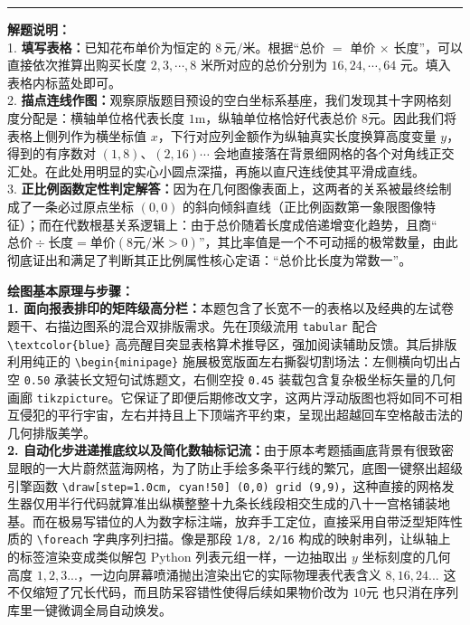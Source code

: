\vspace{0.8cm}
\hrule
\vspace{0.4cm}

{\small\color{gray}
\textbf{解题说明：}\\
1. \textbf{填写表格：}已知花布单价为恒定的 $8\,\text{元/米}$。根据“总价 $=$ 单价 $\times$ 长度”，可以直接依次推算出购买长度 $2, 3, \cdots, 8$ 米所对应的总价分别为 $16, 24, \cdots, 64$ 元。填入表格内标蓝处即可。\\
2. \textbf{描点连线作图：}观察原版题目预设的空白坐标系基座，我们发现其十字网格刻度分配是：横轴单位格代表长度 $1\text{m}$，纵轴单位格恰好代表总价 $8\text{元}$。因此我们将表格上侧列作为横坐标值 $x$，下行对应列金额作为纵轴真实长度换算高度变量 $y$，得到的有序数对 $(1,8)、(2,16) \cdots$ 会地直接落在背景细网格的各个对角线正交汇处。在此处用明显的实心小圆点深描，再施以直尺连线使其平滑成直线。\\
3. \textbf{正比例函数定性判定解答：}因为在几何图像表面上，这两者的关系被最终绘制成了一条必过原点坐标 $(0,0)$ 的斜向倾斜直线（正比例函数第一象限图像特征）；而在代数根基关系逻辑上：由于总价随着长度成倍递增变化趋势，且商“$\text{总价} \div \text{长度} = \text{单价}(8\text{元/米} > 0)$”，其比率值是一个不可动摇的极常数量，由此彻底证出和满足了判断其正比例属性核心定语：“总价比长度为常数一”。
}

\vspace{0.6cm}

{\small\color{blue!70!black}
\textbf{绘图基本原理与步骤：}\\
\textbf{1. 面向报表排印的矩阵级高分栏：}本题包含了长宽不一的表格以及经典的左试卷题干、右描边图系的混合双排版需求。先在顶级流用 \texttt{tabular} 配合 \texttt{\textbackslash textcolor\{blue\}} 高亮醒目突显表格算术推导区，强加阅读辅助反馈。其后排版利用纯正的 \texttt{\textbackslash begin\{minipage\}} 施展极宽版面左右撕裂切割场法：左侧横向切出占空 \texttt{0.50} 承装长文短句试炼题文，右侧空投 \texttt{0.45} 装载包含复杂极坐标矢量的几何画廊 \texttt{tikzpicture}。它保证了即便后期修改文字，这两片浮动版图也将如同不可相互侵犯的平行宇宙，左右并持且上下顶端齐平约束，呈现出超越回车空格敲击法的几何排版美学。\\
\textbf{2. 自动化步进递推底纹以及简化数轴标记流：}由于原本考题插画底背景有很致密显眼的一大片蔚然蓝海网格，为了防止手绘多条平行线的繁冗，底图一键祭出超级引擎函数 \texttt{\textbackslash draw[step=1.0cm, cyan!50] (0,0) grid (9,9)}，这种直接的网格发生器仅用半行代码就算准出纵横整整十九条长线段相交生成的八十一宫格铺装地基。而在极易写错位的人为数字标注端，放弃手工定位，直接采用自带泛型矩阵性质的 \texttt{\textbackslash foreach} 字典序列扫描。像是那段 \texttt{1/8, 2/16} 构成的映射串列，让纵轴上的标签渲染变成类似解包 Python 列表元组一样，一边抽取出 $y$ 坐标刻度的几何高度 $1,2,3...$，一边向屏幕喷涌抛出渲染出它的实际物理表代表含义 $8,16,24...$ 这不仅缩短了冗长代码，而且防呆容错性使得后续如果物价改为 $10\text{元}$ 也只消在序列库里一键微调全局自动焕发。
}

\newpage

